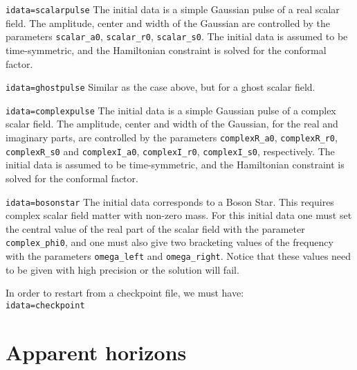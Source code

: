 \documentclass[12pt]{article}
\begin{document}
\begin{list}{}{
\setlength{\leftmargin}{55mm}
\setlength{\labelsep}{10mm}
\setlength{\labelwidth}{45mm}}

\item[\texttt{idata=scalarpulse}] The initial data is a simple
  Gaussian pulse of a real scalar field.  The amplitude, center and
  width of the Gaussian are controlled by the parameters
  \texttt{scalar\_a0}, \texttt{scalar\_r0}, \texttt{scalar\_s0}.  The
  initial data is assumed to be time-symmetric, and the Hamiltonian
  constraint is solved for the conformal factor.

\item[\texttt{idata=ghostpulse}] Similar as the case above, but for a
  ghost scalar field.

\item[\texttt{idata=complexpulse}] The initial data is a simple
  Gaussian pulse of a complex scalar field.  The amplitude, center and
  width of the Gaussian, for the real and imaginary parts, are
  controlled by the parameters \texttt{complexR\_a0},
  \texttt{complexR\_r0}, \texttt{complexR\_s0} and
  \texttt{complexI\_a0}, \linebreak \texttt{complexI\_r0},
  \texttt{complexI\_s0}, respectively.  The initial data is assumed to
  be time-symmetric, and the Hamiltonian constraint is solved for the
  conformal factor.

\item[\texttt{idata=bosonstar}] The initial data corresponds to a
  Boson Star.  This requires complex scalar field matter with non-zero
  mass. For this initial data one must set the central value of the
  real part of the scalar field with the parameter
  \texttt{complex\_phi0}, and one must also give two bracketing values
  of the frequency with the parameters \texttt{omega\_left} and
  \texttt{omega\_right}.  Notice that these values need to be given
  with high precision or the solution will fail.

\end{list}

In order to restart from a checkpoint file, we must have: \\

\texttt{idata=checkpoint} 

\vspace{3mm}



\setcounter{equation}{0}
\section{Apparent horizons}
\label{sec:horizons}
\end{document}
